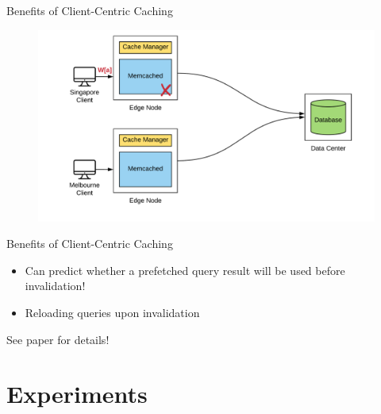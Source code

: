 \documentclass[12pt]{beamer}
\begin{document}
\begin{frame}{Benefits of Client-Centric Caching}
    \begin{figure}
        \center
        \hspace*{-1.5cm}
        \includegraphics[scale=0.17]{apollo_ec_upd}
    \end{figure}
\end{frame}

\begin{frame}[fragile]{Benefits of Client-Centric Caching}
    \begin{itemize}
        \item{Can predict whether a prefetched query result will be used before invalidation!}
        \item{Reloading queries upon invalidation}
    \end{itemize}
   \alert{See paper for details!}
\end{frame}

\section{Experiments}
\end{document}
